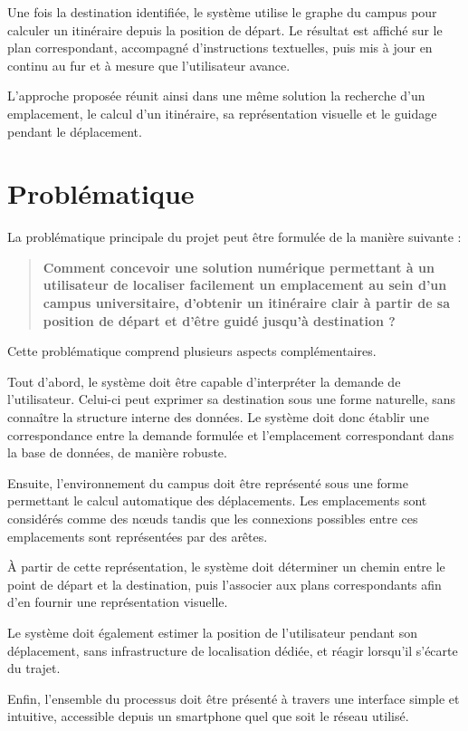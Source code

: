 \documentclass[12pt,a4paper]{report}
\begin{document}
Une fois la destination identifiée, le système utilise le graphe du campus pour calculer un
itinéraire depuis la position de départ. Le résultat est affiché sur le plan correspondant,
accompagné d'instructions textuelles, puis mis à jour en continu au fur et à mesure que
l'utilisateur avance.

L'approche proposée réunit ainsi dans une même solution la recherche d'un emplacement, le calcul
d'un itinéraire, sa représentation visuelle et le guidage pendant le déplacement.

\section{Problématique}

La problématique principale du projet peut être formulée de la manière suivante :

\begin{quote}
\textbf{Comment concevoir une solution numérique permettant à un utilisateur de localiser
facilement un emplacement au sein d'un campus universitaire, d'obtenir un itinéraire clair à
partir de sa position de départ et d'être guidé jusqu'à destination ?}
\end{quote}

Cette problématique comprend plusieurs aspects complémentaires.

Tout d'abord, le système doit être capable d'interpréter la demande de l'utilisateur. Celui-ci
peut exprimer sa destination sous une forme naturelle, sans connaître la structure interne des
données. Le système doit donc établir une correspondance entre la demande formulée et
l'emplacement correspondant dans la base de données, de manière robuste.

Ensuite, l'environnement du campus doit être représenté sous une forme permettant le calcul
automatique des déplacements. Les emplacements sont considérés comme des nœuds tandis que les
connexions possibles entre ces emplacements sont représentées par des arêtes.

À partir de cette représentation, le système doit déterminer un chemin entre le point de départ
et la destination, puis l'associer aux plans correspondants afin d'en fournir une représentation
visuelle.

Le système doit également estimer la position de l'utilisateur pendant son déplacement, sans
infrastructure de localisation dédiée, et réagir lorsqu'il s'écarte du trajet.

Enfin, l'ensemble du processus doit être présenté à travers une interface simple et intuitive,
accessible depuis un smartphone quel que soit le réseau utilisé.
\end{document}
